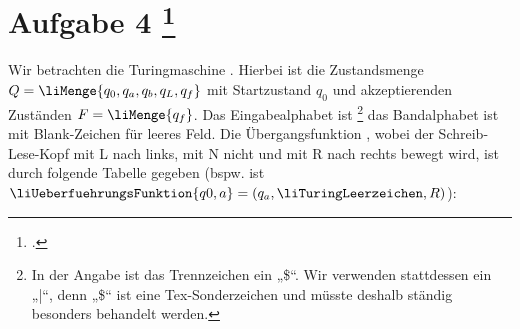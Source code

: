 \documentclass{bschlangaul-aufgabe}
\begin{document}
\let\l=\liTuringLeerzeichen
\let\d=\liUeberfuehrungsFunktion
\let\m=\liMenge
\def\p{ $\vdash$ \\}

\liAufgabenTitel{}
\section{Aufgabe 4
\footcite{examen:66115:2019:03}}

Wir betrachten die Turingmaschine \liTuringMaschine[M]{}. Hierbei ist
die Zustandsmenge $Q = \m{q_0, q_a, q_b, q_L, q_f}$ mit Startzustand
$q_0$ und akzeptierenden Zuständen $F = \m{q_f}$. Das Eingabealphabet
ist \footnote{In der Angabe ist das Trennzeichen ein
„\$“. Wir verwenden stattdessen ein „|“, denn „\$“ ist eine
Tex-Sonderzeichen und müsste deshalb ständig besonders behandelt
werden.} das Bandalphabet ist \liBandAlphabet{\l} mit Blank-Zeichen \l{}
für leeres Feld. Die Übergangsfunktion \liTuringUeberfuehrung, wobei der
Schreib-Lese-Kopf mit L nach links, mit N nicht und mit R nach rechts
bewegt wird, ist durch folgende Tabelle gegeben (bspw. ist $\d{q0, a} =
(q_a, \l, R)$):




\begin{center}
\end{center}
\end{document}
